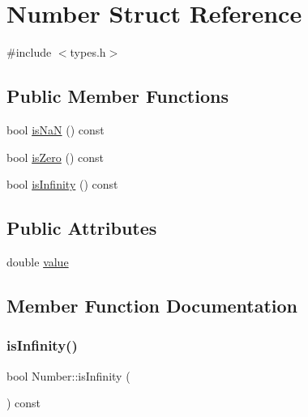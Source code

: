 \hypertarget{struct_number}{}\section{Number Struct Reference}
\label{struct_number}


{\ttfamily \#include $<$types.\+h$>$}

\subsection*{Public Member Functions}
\begin{DoxyCompactItemize}
\item 
bool \hyperlink{struct_number_a2f56b142a6c2f7a91435e4f2081466c5}{is\+NaN} () const
\item 
bool \hyperlink{struct_number_a81a3c3689b85c8fe4ad70a275c8ba1b6}{is\+Zero} () const
\item 
bool \hyperlink{struct_number_a34c22c3727cb3678d81c000807a617b6}{is\+Infinity} () const
\end{DoxyCompactItemize}
\subsection*{Public Attributes}
\begin{DoxyCompactItemize}
\item 
double \hyperlink{struct_number_a39c0611c6e740a144f7450fe529f8f1e}{value}
\end{DoxyCompactItemize}


\subsection{Member Function Documentation}
\mbox{\label{struct_number_a34c22c3727cb3678d81c000807a617b6}} 
\subsubsection{\texorpdfstring{is\+Infinity()}{isInfinity()}}
{\footnotesize\ttfamily bool Number\+::is\+Infinity (\begin{DoxyParamCaption}{ }\end{DoxyParamCaption}) const\hspace{0.3cm}{\ttfamily [inline]}}

\mbox{\label{struct_number_a2f56b142a6c2f7a91435e4f2081466c5}} 
